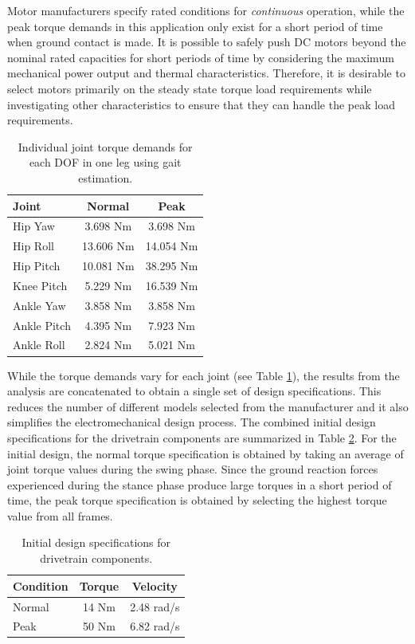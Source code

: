 Motor manufacturers specify rated conditions for \emph{continuous} operation, while the peak torque demands in this application only exist for a short period of time when ground contact is made. It is possible to safely push DC motors beyond the nominal rated capacities for short periods of time by considering the maximum mechanical power output and thermal characteristics. Therefore, it is desirable to select motors primarily on the steady state torque load requirements while investigating other characteristics to ensure that they can handle the peak load requirements. 

\begin{table}[!h]
  \centering
  \caption{Individual joint torque demands for each DOF in one leg using gait estimation.}
    \begin{tabular}{lcc}
    \addlinespace
    \toprule
    \textbf{Joint} & \textbf{Normal} & \textbf{Peak}\\
    \midrule
    Hip Yaw		&	3.698 Nm	&	3.698 Nm\\
    Hip Roll	&	13.606 Nm	&	14.054 Nm\\
    Hip Pitch	&	10.081 Nm	&	38.295 Nm\\
    Knee Pitch  &	5.229 Nm	&	16.539 Nm\\
    Ankle Yaw	&	3.858 Nm	&	3.858 Nm\\
    Ankle Pitch	&	4.395 Nm	&	7.923 Nm\\
    Ankle Roll	&	2.824 Nm	&	5.021 Nm\\
    \bottomrule
    \end{tabular}%
  \label{jointtable}%
\end{table}%

While the torque demands vary for each joint (see Table \ref{jointtable}), the results from the analysis are concatenated to obtain a single set of design specifications. This reduces the number of different models selected from the manufacturer and it also simplifies the electromechanical design process. The combined initial design specifications for the drivetrain components are summarized in Table \ref{tab:spectable}. For the initial design, the normal torque specification is obtained by taking an average of joint torque values during the swing phase. Since the ground reaction forces experienced during the stance phase produce large torques in a short period of time, the peak torque specification is obtained by selecting the highest torque value from all frames. 

\begin{table}[!h]
  \centering
  \caption{Initial design specifications for drivetrain components.}
    \begin{tabular}{lcc}
    \addlinespace
    \toprule
    \textbf{Condition} & \textbf{Torque} & \textbf{Velocity}\\
    \midrule
    Normal & 14 Nm & 2.48 rad/s\\
    Peak  & 50 Nm & 6.82 rad/s \\
    \bottomrule
    \end{tabular}%
  \label{tab:spectable}%
\end{table}%

